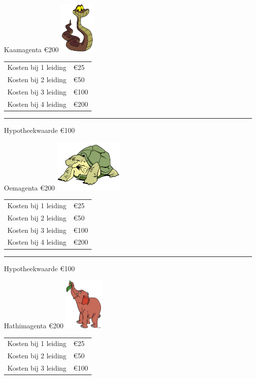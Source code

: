 \documentclass[11pt]{article}
\newcommand{\scheiding}{
    \rule[0.5ex]{\linewidth}{1pt}
}
\begin{document}
\begin{tcbraster}[raster columns=3, raster equal height, left=0mm, right=0mm,
                    raster column skip=0mm,
                    raster row skip=0mm,
                    sharp corners]
\begin{kaartje}{Kaa}{magenta}
    €200
    \tcblower{}
    \includegraphics[height=7em]{fig/kaa.png}
    \begin{tabular}{ll}
        Kosten bij 1 leiding & €25  \\
        Kosten bij 2 leiding & €50  \\
        Kosten bij 3 leiding & €100 \\
        Kosten bij 4 leiding & €200
    \end{tabular}
    \scheiding{}
    {\small Hypotheekwaarde €100}
\end{kaartje}
\begin{kaartje}{Oe}{magenta}
    €200
    \tcblower{}
    \includegraphics[height=7em]{fig/oe.png}
    \begin{tabular}{ll}
        Kosten bij 1 leiding & €25  \\
        Kosten bij 2 leiding & €50  \\
        Kosten bij 3 leiding & €100 \\
        Kosten bij 4 leiding & €200
    \end{tabular}
    \scheiding{}
    {\small Hypotheekwaarde €100}
\end{kaartje}
\begin{kaartje}{Hathi}{magenta}
    €200
    \tcblower{}
    \includegraphics[height=7em]{fig/hathi.png}
    \begin{tabular}{ll}
        Kosten bij 1 leiding & €25  \\
        Kosten bij 2 leiding & €50  \\
        Kosten bij 3 leiding & €100 \\

\end{tabular}
\end{kaartje}
\end{tcbraster}
\end{document}
